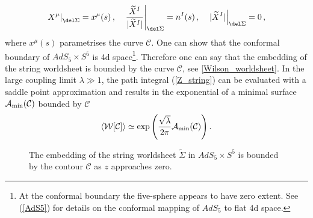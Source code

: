 %
%
\begin{equation}
\left. X^{\mu} \right\vert_{\del \Sigma} = x^{\mu}(s) \,,\quad   \left.\frac{\widetilde{X}^{I}}{\vert \widetilde{X}^{I}\vert} \right\vert_{\del \Sigma} = n^{I}(s) \,, \quad   \left. \vert \widetilde{X}^{I} \vert \right\vert_{\del \Sigma} = 0\,,
\end{equation}
%
%
where $x^{\mu}(s)$ parametrises the curve $\mathcal{C}$. One can show that the conformal boundary of $AdS_{5}\times S^{5}$ is 4d  space\footnote{At the conformal boundary the five-sphere appears to have zero extent. See (\ref{AdS5}) for details on the conformal mapping of $AdS_{5}$ to flat 4d  space.}. Therefore one can say that the embedding of the string worldsheet is bounded by the curve $\mathcal{C}$, see \autoref{Wilson_worldsheet}. In the large  coupling limit $\lambda \gg 1$, the path integral (\ref{Z_string}) can be evaluated with a saddle point approximation and results in the exponential of a minimal surface $\mathcal{A}_{\rm min}(\mathcal{C})$ bounded by $\mathcal{C}$
%
%
\begin{equation}
\langle \mathcal{W}[\mathcal{C}]\rangle \simeq \exp \left( \frac{\sqrt{\lambda}}{2\pi} \mathcal{A}_{\rm min}(\mathcal{C}) \right).
\end{equation}
%
%
\begin{figure}
\begin{center}
\caption{The embedding of the string worldsheet $\widetilde{\Sigma}$ in $AdS_{5}\times S^{5}$ is bounded by the contour $\mathcal{C}$ as $z$ approaches zero.\label{Wilson_worldsheet}}
\end{center}
\end{figure}
%
%
%
%
%
%
%
